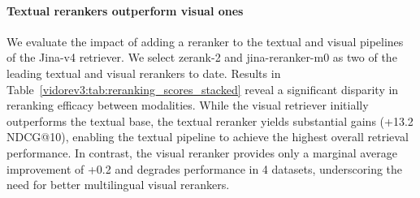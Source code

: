 
\paragraph{Textual rerankers outperform visual ones}

We evaluate the impact of adding a reranker to the textual and visual pipelines of the Jina-v4 retriever. We select zerank-2  and jina-reranker-m0  as two of the leading textual and visual rerankers to date. Results in Table~\ref{vidorev3:tab:reranking_scores_stacked} reveal a significant disparity in reranking efficacy between modalities. While the visual retriever initially outperforms the textual base, the textual reranker yields substantial gains (+13.2 NDCG@10), enabling the textual pipeline to achieve the highest overall retrieval performance. In contrast, the visual reranker provides only a marginal average improvement of +0.2 and degrades performance in 4 datasets, underscoring the need for better multilingual visual rerankers.


